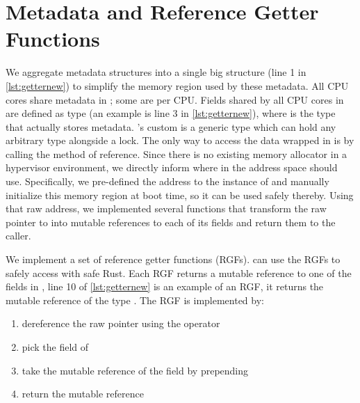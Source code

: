 \section{\rustcore{} Metadata and Reference Getter Functions}
We aggregate \rustcore{} metadata structures
into a single big structure 
(line 1 in \autoref{lst:getternew})
to simplify the memory region used by these metadata.
All CPU cores share metadata in \rustcore{}; some are per CPU.
Fields shared by all CPU cores in  are defined as type 
(an example is line 3 in \autoref{lst:getternew}),
where  is the type that actually stores \rustcore{} metadata.
\rustcore{}'s custom \code{\lock{}} is a generic type which can hold any
arbitrary type alongside a lock.
The only way to access the data wrapped in \code{\lock{}} is by calling the
 method of \code{\lock{}} reference.
Since there is no existing memory allocator in a hypervisor environment,
we directly inform where in the address space \rustcore{} should use.
Specifically, we pre-defined the address to the instance of 
and manually initialize this memory region at boot time,
so it can be used safely thereby.
Using that raw address, we implemented several functions that
transform the raw pointer to  into mutable references to
each of its fields and return them to the caller.

We implement a set of reference getter functions (RGFs). \rustcore{}
can use the RGFs to safely access  with safe Rust.
Each RGF returns a mutable reference to one of the fields in ,
line 10 of \autoref{lst:getternew} is an example of an RGF, it returns the mutable reference
of the type . The RGF is implemented by:

\begin{enumerate}
  \item dereference the raw pointer using the \code{*} operator
  \item pick the  field of 
  \item take the mutable reference of the field by prepending 
  \item return the mutable reference
\end{enumerate}

